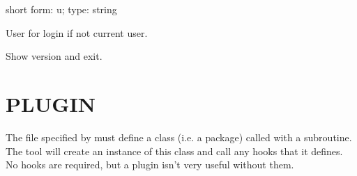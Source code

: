 \documentclass[letterpaper,10pt,english]{sphinxmanual}
\begin{document}

\begin{fulllineitems}
\label{\detokenize{mariadb-schema-change:cmdoption-mariadb-schema-change-user}}
\sphinxAtStartPar
short form: \sphinxhyphen{}u; type: string

\sphinxAtStartPar
User for login if not current user.

\end{fulllineitems}


\begin{fulllineitems}
\label{\detokenize{mariadb-schema-change:cmdoption-mariadb-schema-change-version}}
\sphinxAtStartPar
Show version and exit.

\end{fulllineitems}



\section{PLUGIN}
\label{\detokenize{mariadb-schema-change:plugin}}
\sphinxAtStartPar
The file specified by {\hyperref[\detokenize{mariadb-schema-change:cmdoption-mariadb-schema-change-plugin}]{}} must define a class (i.e. a package)
called  with a  subroutine.
The tool will create an instance of this class and call any hooks that
it defines.  No hooks are required, but a plugin isn’t very useful without
them.
\end{document}
